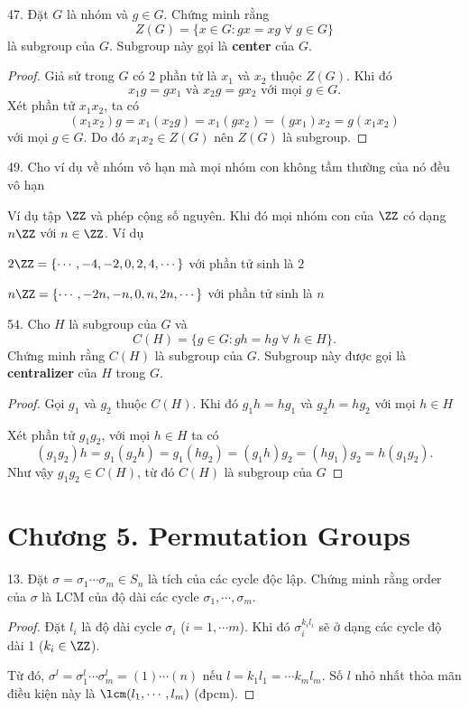 47. Đặt $G$ là nhóm và $g \in G$. Chứng minh rằng \[ Z(G) = \{ x \in G: gx = xg \; \forall \; g \in G \} \] là subgroup của $G$. Subgroup này gọi là \textbf{center} của $G$.

\begin{proof}
    Giả sử trong $G$ có 2 phần tử là $x_1$ và $x_2$ thuộc $Z(G)$. Khi đó \[ x_1 g = g x_1 \text{ và } x_2 g = g x_2 \text{ với mọi } g \in G. \]
    Xét phần tử $x_1 x_2$, ta có \[ (x_1 x_2) g = x_1 (x_2 g) = x_1 (g x_2) = (g x_1) x_2 = g (x_1 x_2) \] với mọi $g \in G$. Do đó $x_1 x_2 \in Z(G)$ nên $Z(G)$ là subgroup.
\end{proof}

49. Cho ví dụ về nhóm vô hạn mà mọi nhóm con không tầm thường của nó đều vô hạn

Ví dụ tập $\ZZ$ và phép cộng số nguyên. Khi đó mọi nhóm con của $\ZZ$ có dạng $n\ZZ$ với $n \in \ZZ$. Ví dụ

$2\ZZ = \{\cdots, -4, -2, 0, 2, 4, \cdots\}$ với phần tử sinh là $2$

$n\ZZ = \{\cdots, -2n, -n, 0, n, 2n, \cdots\}$ với phần tử sinh là $n$

54. Cho $H$ là subgroup của $G$ và \[ C(H) = \{g \in G: gh = hg \; \forall \; h \in H\}. \] Chứng minh rằng $C(H)$ là subgroup của $G$. Subgroup này được gọi là \textbf{centralizer} của $H$ trong $G$.

\begin{proof}
    Gọi $g_1$ và $g_2$ thuộc $C(H)$. Khi đó $g_1 h = h g_1$ và $g_2 h = h g_2$ với mọi $h \in H$

    Xét phần tử $g_1 g_2$, với mọi $h \in H$ ta có \[ (g_1 g_2) h = g_1 (g_2 h) = g_1 (h g_2) = (g_1 h) g_2 = (h g_1) g_2 = h (g_1 g_2). \]
    Như vậy $g_1 g_2 \in C(H)$, từ đó $C(H)$ là subgroup của $G$
\end{proof}

\section*{Chương 5. Permutation Groups}

13. Đặt $\sigma = \sigma_1 \cdots \sigma_m \in S_n$ là tích của các cycle độc lập. Chứng minh rằng order của $\sigma$ là LCM của độ dài các cycle $\sigma_1, \cdots, \sigma_m$.

\begin{proof}
    Đặt $l_i$ là độ dài cycle $\sigma_i$ ($i = 1, \cdots m$). Khi đó $\sigma_i^{k_i l_i}$ sẽ ở dạng các cycle độ dài 1 ($k_i \in \ZZ$).

    Từ đó, $\sigma^l = \sigma_1^l \cdots \sigma_m^l = (1)\cdots(n)$ nếu $l = k_1 l_1 = \cdots k_m l_m$. Số $l$ nhỏ nhất thỏa mãn điều kiện này là $\lcm(l_1, \cdots, l_m)$ (đpcm).
\end{proof}


